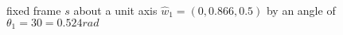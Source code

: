 \documentclass[preview]{standalone}
\begin{document}
\begin{center}
fixed frame ${s}$ about a unit axis $\hat{w}_1 = (0, 0.866, 0.5)$ by an angle of $\theta_1=30=0.524rad$
\end{center}
\end{document}
